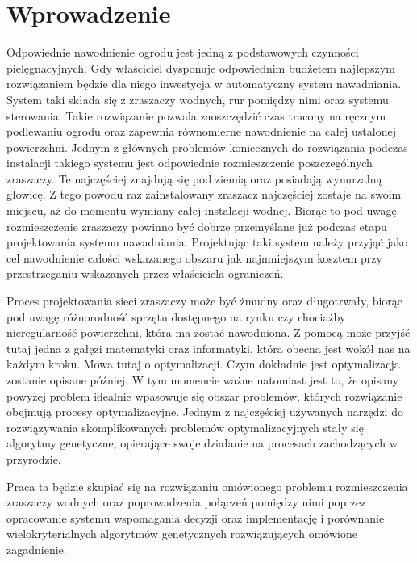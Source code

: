 \documentclass[twoside]{iisthesis}
\begin{document}
\section{Wprowadzenie}
Odpowiednie nawodnienie ogrodu jest jedną z podstawowych czynności pielęgnacyjnych. Gdy właściciel dysponuje odpowiednim budżetem najlepszym rozwiązaniem będzie dla niego inwestycja w automatyczny system nawadniania. System taki składa się z zraszaczy wodnych, rur pomiędzy nimi oraz systemu sterowania. Takie rozwiązanie pozwala zaoszczędzić czas tracony na ręcznym podlewaniu ogrodu oraz zapewnia równomierne nawodnienie na całej ustalonej powierzchni. Jednym z głównych problemów koniecznych do rozwiązania podczas instalacji takiego systemu jest odpowiednie rozmieszczenie poszczególnych zraszaczy. Te najczęściej znajdują się pod ziemią oraz posiadają wynurzalną głowicę. Z tego powodu raz zainstalowany zraszacz najczęściej zostaje na swoim miejscu, aż do momentu wymiany całej instalacji wodnej. Biorąc to pod uwagę rozmieszczenie zraszaczy powinno być dobrze przemyślane już podczas etapu projektowania systemu nawadniania. Projektując taki system należy przyjąć jako cel nawodnienie całości wskazanego obszaru jak najmniejszym kosztem przy przestrzeganiu wskazanych przez właściciela ograniczeń.

Proces projektowania sieci zraszaczy może być żmudny oraz długotrwały, biorąc pod uwagę różnorodność sprzętu dostępnego na rynku czy chociażby nieregularność powierzchni, która ma zostać nawodniona. Z pomocą może przyjść tutaj jedna z gałęzi matematyki oraz informatyki, która obecna jest wokół nas na każdym kroku. Mowa tutaj o optymalizacji. Czym dokładnie jest optymalizacja zostanie opisane później. W tym momencie ważne natomiast jest to, że opisany powyżej problem idealnie wpasowuje się obszar problemów, których rozwiązanie obejmują procesy optymalizacyjne. Jednym z najczęściej używanych narzędzi do rozwiązywania skomplikowanych problemów optymalizacyjnych stały się algorytmy genetyczne, opierające swoje działanie na procesach zachodzących w przyrodzie.

Praca ta będzie skupiać się na rozwiązaniu omówionego problemu rozmieszczenia zraszaczy wodnych oraz poprowadzenia połączeń pomiędzy nimi poprzez opracowanie systemu wspomagania decyzji oraz implementację i porównanie wielokryterialnych algorytmów genetycznych rozwiązujących omówione zagadnienie.
\end{document}
